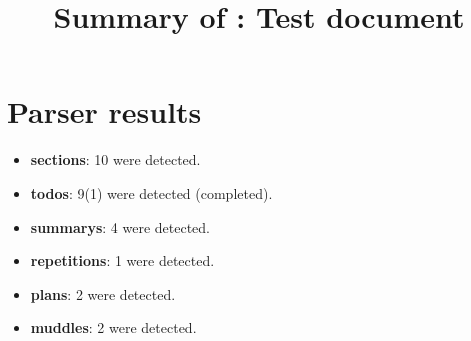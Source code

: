\title{Summary of : Test document}
\maketitle

\section{Parser results}
    \begin{itemize}[noitemsep]
\item \textbf{sections}: 10 were detected.
\item \textbf{todos}: 9(1) were detected (completed).
\item \textbf{summarys}: 4 were detected.
\item \textbf{repetitions}: 1 were detected.
\item \textbf{plans}: 2 were detected.
\item \textbf{muddles}: 2 were detected.
    \end{itemize}

